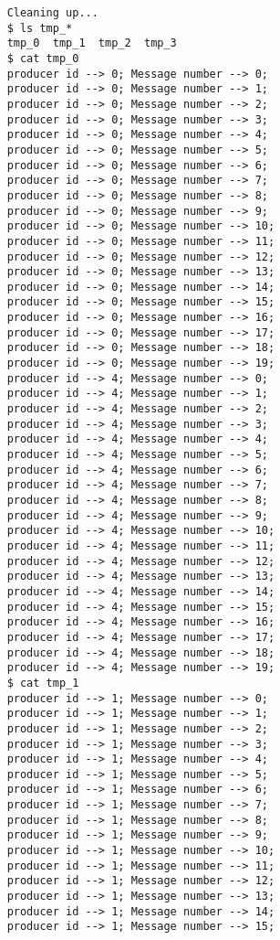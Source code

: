 \documentclass[11pt]{article}
\begin{document}
\begin{question}
\begin{subquestion}
\begin{itemize}
{\begin{verbatim}
    Cleaning up...
    $ ls tmp_*
    tmp_0  tmp_1  tmp_2  tmp_3
    $ cat tmp_0
    producer id --> 0; Message number --> 0;
    producer id --> 0; Message number --> 1;
    producer id --> 0; Message number --> 2;
    producer id --> 0; Message number --> 3;
    producer id --> 0; Message number --> 4;
    producer id --> 0; Message number --> 5;
    producer id --> 0; Message number --> 6;
    producer id --> 0; Message number --> 7;
    producer id --> 0; Message number --> 8;
    producer id --> 0; Message number --> 9;
    producer id --> 0; Message number --> 10;
    producer id --> 0; Message number --> 11;
    producer id --> 0; Message number --> 12;
    producer id --> 0; Message number --> 13;
    producer id --> 0; Message number --> 14;
    producer id --> 0; Message number --> 15;
    producer id --> 0; Message number --> 16;
    producer id --> 0; Message number --> 17;
    producer id --> 0; Message number --> 18;
    producer id --> 0; Message number --> 19;
    producer id --> 4; Message number --> 0;
    producer id --> 4; Message number --> 1;
    producer id --> 4; Message number --> 2;
    producer id --> 4; Message number --> 3;
    producer id --> 4; Message number --> 4;
    producer id --> 4; Message number --> 5;
    producer id --> 4; Message number --> 6;
    producer id --> 4; Message number --> 7;
    producer id --> 4; Message number --> 8;
    producer id --> 4; Message number --> 9;
    producer id --> 4; Message number --> 10;
    producer id --> 4; Message number --> 11;
    producer id --> 4; Message number --> 12;
    producer id --> 4; Message number --> 13;
    producer id --> 4; Message number --> 14;
    producer id --> 4; Message number --> 15;
    producer id --> 4; Message number --> 16;
    producer id --> 4; Message number --> 17;
    producer id --> 4; Message number --> 18;
    producer id --> 4; Message number --> 19;
    $ cat tmp_1
    producer id --> 1; Message number --> 0;
    producer id --> 1; Message number --> 1;
    producer id --> 1; Message number --> 2;
    producer id --> 1; Message number --> 3;
    producer id --> 1; Message number --> 4;
    producer id --> 1; Message number --> 5;
    producer id --> 1; Message number --> 6;
    producer id --> 1; Message number --> 7;
    producer id --> 1; Message number --> 8;
    producer id --> 1; Message number --> 9;
    producer id --> 1; Message number --> 10;
    producer id --> 1; Message number --> 11;
    producer id --> 1; Message number --> 12;
    producer id --> 1; Message number --> 13;
    producer id --> 1; Message number --> 14;
    producer id --> 1; Message number --> 15;

\end{verbatim}}
\end{itemize}
\end{subquestion}
\end{question}
\end{document}
